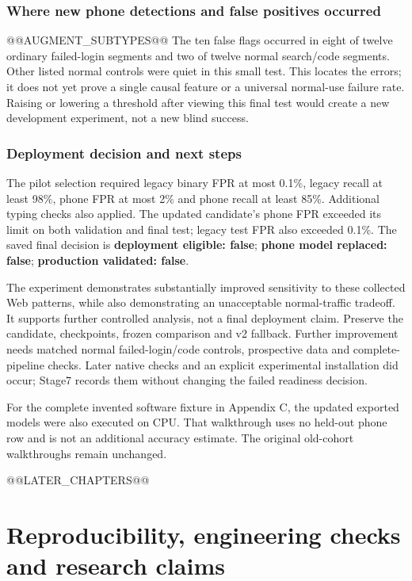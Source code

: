 \documentclass[11pt,a4paper,oneside]{report}
\begin{document}
\subsection{Where new phone detections and false positives occurred}
@@AUGMENT_SUBTYPES@@
The ten false flags occurred in eight of twelve ordinary failed-login segments and two of twelve normal search/code segments. Other listed normal controls were quiet in this small test. This locates the errors; it does not yet prove a single causal feature or a universal normal-use failure rate. Raising or lowering a threshold after viewing this final test would create a new development experiment, not a new blind success.

\subsection{Deployment decision and next steps}
The pilot selection required legacy binary FPR at most 0.1\%, legacy recall at least 98\%, phone FPR at most 2\% and phone recall at least 85\%. Additional typing checks also applied. The updated candidate's phone FPR exceeded its limit on both validation and final test; legacy test FPR also exceeded 0.1\%. The saved final decision is \textbf{deployment eligible: false}; \textbf{phone model replaced: false}; \textbf{production validated: false}.

The experiment demonstrates substantially improved sensitivity to these collected Web patterns, while also demonstrating an unacceptable normal-traffic tradeoff. It supports further controlled analysis, not a final deployment claim. Preserve the candidate, checkpoints, frozen comparison and v2 fallback. Further improvement needs matched normal failed-login/code controls, prospective data and complete-pipeline checks. Later native checks and an explicit experimental installation did occur; Stage7 records them without changing the failed readiness decision.

For the complete invented software fixture in Appendix C, the updated exported models were also executed on CPU. That walkthrough uses no held-out phone row and is not an additional accuracy estimate. The original old-cohort walkthroughs remain unchanged.

@@LATER_CHAPTERS@@

\chapter{Reproducibility, engineering checks and research claims}
\end{document}
